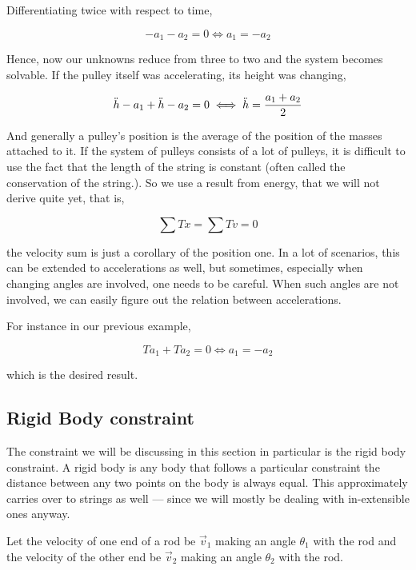 Differentiating twice with respect to time, 

\begin{equation*}
    - a_1 - a_2 = 0 \iff a_1 = -a_2
\end{equation*}

Hence, now our unknowns reduce from three to two and the system becomes solvable.
If the pulley itself was accelerating, its height was changing,

\begin{equation*}
    \ddot{h} - a_1 + \ddot{h} - a_2 = 0 \iff \ddot{h} = \frac{a_1 + a_2}{2}
\end{equation*}

And generally a pulley's position is the average of the position of the masses attached to it.
If the system of pulleys consists of a lot of pulleys, it is difficult to use 
the fact that the length of the string is constant (often called the conservation of 
the string.). So we use a result from energy, that we will not derive quite yet, that is,

\begin{equation*}
    \sum Tx = \sum Tv = 0
\end{equation*}

the velocity sum is just a corollary of the position one. In a lot of scenarios, 
this can be extended to accelerations as well, but sometimes, especially when 
changing angles are involved, one needs to be careful. When such angles are not 
involved, we can easily figure out the relation between accelerations. 

For instance in our previous example,

\begin{equation*}
    Ta_1 + Ta_2 = 0 \iff a_1 = -a_2
\end{equation*}

which is the desired result.

\subsection{Rigid Body constraint}

The constraint we will be discussing in this section in particular is the rigid body constraint.
A rigid body is any body that follows a particular constraint the distance between
any two points on the body is always equal. This approximately carries over to 
strings as well --- since we will mostly be dealing with in-extensible ones anyway.

Let the velocity of one end of a rod be \(\vec{v}_1\) making an angle \(\theta_1\) with the rod
and the velocity of the other end be \(\vec{v}_2\) making an angle \(\theta_2\) with the rod.

